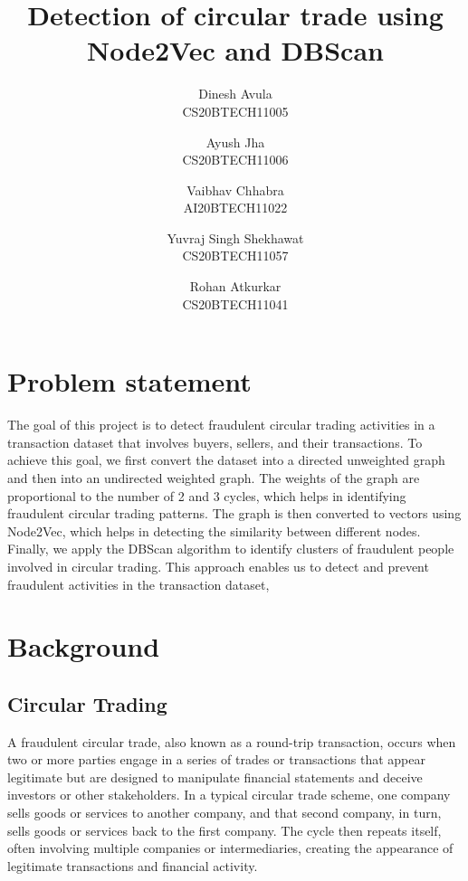 \documentclass[12pt,a4paper]{article}
\begin{document}
\title{Detection of circular trade using Node2Vec and DBScan}

\author{Dinesh Avula\\CS20BTECH11005
\and Ayush Jha\\CS20BTECH11006 \and Vaibhav Chhabra\\AI20BTECH11022 \and Yuvraj Singh Shekhawat\\CS20BTECH11057 \and
Rohan Atkurkar\\CS20BTECH11041 }


\maketitle

\section{Problem statement}
The goal of this project is to detect fraudulent circular trading activities in a transaction dataset that involves buyers, sellers, and their transactions. To achieve this goal, we first convert the dataset into a directed unweighted graph and then into an undirected weighted graph. The weights of the graph are proportional to the number of 2 and 3 cycles, which helps in identifying fraudulent circular trading patterns. The graph is then converted to vectors using Node2Vec, which helps in detecting the similarity between different nodes. Finally, we apply the DBScan algorithm to identify clusters of fraudulent people involved in circular trading. This approach enables us to detect and prevent fraudulent activities in the transaction dataset,

\section{Background}
\subsection{Circular Trading}
A fraudulent circular trade, also known as a round-trip transaction, occurs when two or more parties engage in a series of trades or transactions that appear legitimate but are designed to manipulate financial statements and deceive investors or other stakeholders. In a typical circular trade scheme, one company sells goods or services to another company, and that second company, in turn, sells goods or services back to the first company. The cycle then repeats itself, often involving multiple companies or intermediaries, creating the appearance of legitimate transactions and financial activity. 
\end{document}
